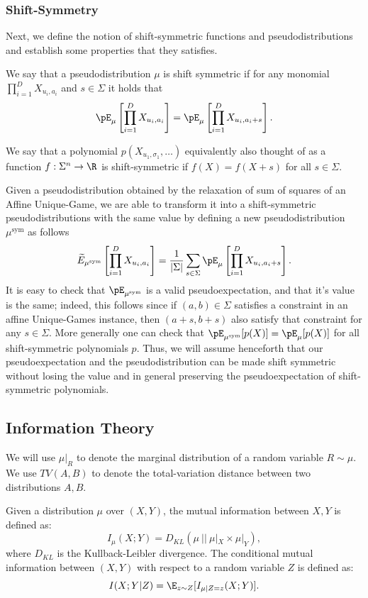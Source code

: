 \subsubsection{Shift-Symmetry}\label{sec:symm-prelims}
Next, we define the notion of shift-symmetric functions and pseudodistributions and establish some properties that they
satisfies.
\begin{definition}\label{def:shift-symm}
We say that a pseudodistribution $\mu$ is shift symmetric if 
for any monomial $\prod\limits_{i=1}^{D} X_{u_i, a_i}$ and $s\in\Sigma$ it holds that
\[
\pE_{\mu}\left[\prod\limits_{i=1}^{D} X_{u_i, a_i}\right]
=
\pE_{\mu}\left[\prod\limits_{i=1}^{D} X_{u_i, a_i+s}\right].
\]
\end{definition}
We say that a polynomial $p(X_{u_1,\sigma_1},\ldots)$ equivalently also thought of as a function $f: \Sigma^n \rightarrow \R$ is shift-symmetric if $f(X) = f(X+s)$ for all $s \in \Sigma$.

Given a pseudodistribution obtained by the \sos relaxation of sum of squares of an 
Affine Unique-Game, we are able to 
transform it into a shift-symmetric pseudodistributions 
with the same value by defining a new pseudodistribution $\mu^{\text{sym}}$ as follows
\[
\widetilde{E}_{\mu^{\text{sym}}}\left[\prod\limits_{i=1}^{D} X_{u_i, a_i}\right] 
= 
\frac{1}{|\Sigma|}\sum\limits_{s\in\Sigma}
\pE_{\mu}\left[\prod\limits_{i=1}^{D} X_{u_i, a_i+s}\right].
\]
It is easy to check that $\pE_{\mu^{\text{sym}}}$ is a valid pseudoexpectation, 
and that it's value is the same; indeed, this follows since if $(a,b)\in \Sigma$ satisfies a constraint in an affine Unique-Games instance, then $(a+s,b+s)$ also satisfy that 
constraint for any $s\in\Sigma$. More generally one can check that $\pE_{\mu^{\text{sym}}}[p(X)] = \pE_{\mu}[p(X)]$ for all shift-symmetric polynomials $p$.
Thus, we will assume henceforth that our pseudoexpectation and the pseudodistribution can be made shift symmetric without losing the value and in general preserving the pseudoexpectation of shift-symmetric polynomials. 



\subsection{Information Theory}
We will use $\mu|_R$ to denote the marginal distribution of a random variable $R \sim \mu$. We use $TV(A,B)$ to denote the total-variation distance between two distributions $A,B$.

\begin{definition}
Given a distribution $\mu$ over $(X,Y)$, the mutual information between $X,Y$ is defined as:
\[I_\mu(X;Y) = D_{KL}(\mu~ || ~\mu|_X \times \mu|_Y),\]
where $D_{KL}$ is the Kullback-Leibler divergence. The conditional mutual information between $(X,Y)$ with respect to a random variable $Z$ is defined as:
\[I(X;Y | Z) = \E_{z \sim Z}[I_{\mu | Z = z}(X;Y)].\]
\end{definition}

